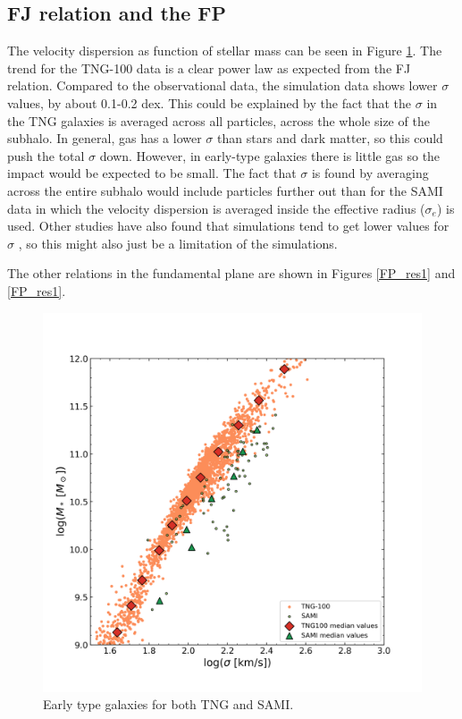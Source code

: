 \subsection{FJ relation and the FP}

The velocity dispersion as function of stellar mass can be seen in Figure \ref{FJ_res}. The trend for the TNG-100 data is a clear power law as expected from the FJ relation. Compared to the observational data, the simulation data shows lower $\sigma$ values, by about 0.1-0.2 dex. This could be explained by the fact that the $\sigma$ in the TNG galaxies is averaged across all particles, across the whole size of the subhalo. In general, gas has a lower $\sigma$ than stars and dark matter, so this could push the total $\sigma$ down. However, in early-type galaxies there is little gas so the impact would be expected to be small. The fact that $\sigma$ is found by averaging across the entire subhalo would include particles further out than for the SAMI data in which the velocity dispersion is averaged inside the effective radius ($\sigma_{e}$) is used. Other studies have also found that simulations tend to get lower values for $\sigma$ \parencite{Sande2018}, so this might also just be a limitation of the simulations.

The other relations in the fundamental plane are shown in Figures \ref{FP_res1} and \ref{FP_res1}.

\begin{figure}
    \centering
    \includegraphics[width=\textwidth]{images/results_faber_jackson.png}
    \caption{Early type galaxies for both TNG and SAMI.}
    \label{FJ_res}
\end{figure}

